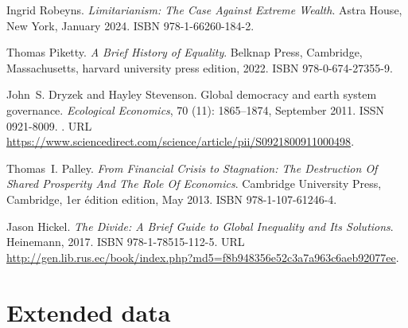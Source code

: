 \documentclass[12pt,english]{article}
\begin{document}
\begin{thebibliography}{55}
  Ingrid Robeyns.
  \newblock \emph{{Limitarianism: The Case Against Extreme Wealth}}.
  \newblock Astra House, New York, January 2024.
  \newblock ISBN 978-1-66260-184-2.
  
  Thomas Piketty.
  \newblock \emph{A {{Brief History}} of {{Equality}}}.
  \newblock Belknap Press, Cambridge, Massachusetts, harvard university press
    edition, 2022.
  \newblock ISBN 978-0-674-27355-9.
  
  John~S. Dryzek and Hayley Stevenson.
  \newblock Global democracy and earth system governance.
  \newblock \emph{Ecological Economics}, 70 (11): 1865--1874,
    September 2011.
  \newblock ISSN 0921-8009.
  \newblock {}.
  \newblock URL
    \url{https://www.sciencedirect.com/science/article/pii/S0921800911000498}.
  
  Thomas~I. Palley.
  \newblock \emph{{From Financial Crisis to Stagnation: The Destruction Of Shared
    Prosperity And The Role Of Economics}}.
  \newblock Cambridge University Press, Cambridge, 1er {\'e}dition edition, May
    2013.
  \newblock ISBN 978-1-107-61246-4.
  
  Jason Hickel.
  \newblock \emph{The {{Divide}}: {{A Brief Guide}} to {{Global Inequality}} and
    Its {{Solutions}}}.
  \newblock Heinemann, 2017.
  \newblock ISBN 978-1-78515-112-5.
  \newblock URL
    \url{http://gen.lib.rus.ec/book/index.php?md5=f8b948356e52c3a7a963c6aeb92077ee}.
  
  \end{thebibliography}

  

\appendix %
\renewcommand{\thetable}{ED\arabic{table}}
\renewcommand{\thefigure}{ED\arabic{figure}}
\setcounter{figure}{0}
\setcounter{table}{0}

\clearpage
\section*{Extended data}

\begin{table}[h]
  \caption[Campaign and bandwagon effects on the support for the GCS.]{Effects on the support for the GCS of a question on its pros and cons (either in open-ended of closed format) and on information about the actual support, in the U.S. (See Section D %
  in the \textit{US2} Questionnaire)  %
  } \label{tab:branch_gcs}
  \makebox[\textwidth][c]{
      
  }
  {\footnotesize %
  }
\end{table}
\end{document}
